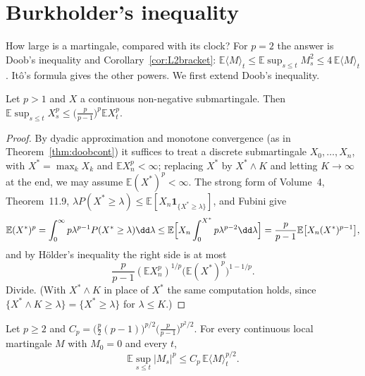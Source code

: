 \section{Burkholder's inequality}

How large is a martingale, compared with its clock? For $p=2$ the answer is Doob's inequality and Corollary~\ref{cor:L2bracket}: $\mathbb E\langle M\rangle_t\le\mathbb E\sup_{s\le t}M_s^2\le4\,\mathbb E\langle M\rangle_t$. It\^o's formula
gives the other powers. We first extend Doob's inequality.

\begin{lemma}\label{lem:doobp}
Let $p>1$ and $X$ a continuous non-negative submartingale. Then $\mathbb E\sup_{s\le t}X_s^p\le\bigl(\frac p{p-1}\bigr)^p\mathbb EX_t^p$.
\end{lemma}

\begin{proof}
By dyadic approximation and monotone convergence (as in Theorem~\ref{thm:doobcont}) it suffices to treat a discrete submartingale $X_0,\dots,X_n$, with $X^*=\max_kX_k$ and $\mathbb EX_n^p<\infty$; replacing $X^*$ by $X^*\wedge K$
and letting $K\to\infty$ at the end, we may assume $\mathbb E(X^*)^p<\infty$. The strong form of Volume~4, Theorem~11.9, $\lambda P(X^*\ge\lambda)\le\mathbb E[X_n\mathbf 1_{\{X^*\ge\lambda\}}]$, and Fubini give
\[
\mathbb E(X^*)^p=\int_0^\infty p\lambda^{p-1}P(X^*\ge\lambda)\dd\lambda\le\mathbb E\Bigl[X_n\int_0^{X^*}p\lambda^{p-2}\dd\lambda\Bigr]=\frac p{p-1}\mathbb E\bigl[X_n(X^*)^{p-1}\bigr],
\]
and by H\"older's inequality the right side is at most
\[
\frac p{p-1}(\mathbb EX_n^p)^{1/p}\bigl(\mathbb E(X^*)^p\bigr)^{1-1/p}.
\]
Divide. (With $X^*\wedge K$ in place of $X^*$ the same computation holds, since
$\{X^*\wedge K\ge\lambda\}=\{X^*\ge\lambda\}$ for $\lambda\le K$.)
\end{proof}

\begin{theorem}[Burkholder, 1966]\label{thm:bdg}
Let $p\ge2$ and $C_p=\bigl(\frac{p}{2}(p-1)\bigr)^{p/2}\bigl(\frac p{p-1}\bigr)^{p^2/2}$. For every continuous local martingale $M$ with $M_0=0$ and every $t$,
\[
\mathbb E\sup_{s\le t}|M_s|^p\le C_p\,\mathbb E\langle M\rangle_t^{p/2}.
\]
\end{theorem}


